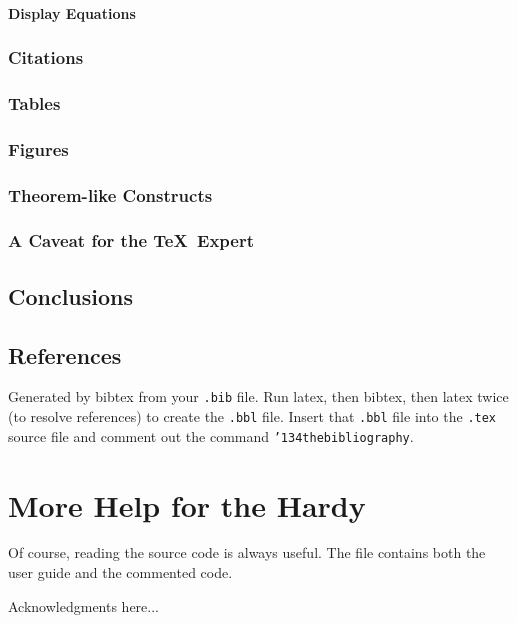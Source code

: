 \paragraph{Display Equations}
\subsubsection{Citations}
\subsubsection{Tables}
\subsubsection{Figures}
\subsubsection{Theorem-like Constructs}
\subsubsection*{A Caveat for the \TeX\ Expert}
\subsection{Conclusions}
\subsection{References}
Generated by bibtex from your \texttt{.bib} file.  Run latex,
then bibtex, then latex twice (to resolve references)
to create the \texttt{.bbl} file.  Insert that \texttt{.bbl}
file into the \texttt{.tex} source file and comment out
the command \texttt{{\char'134}thebibliography}.
\section{More Help for the Hardy}

Of course, reading the source code is always useful.  The file
 contains both the user guide and the commented
code.

\begin{acks}
  Acknowledgments here...

\end{acks}
